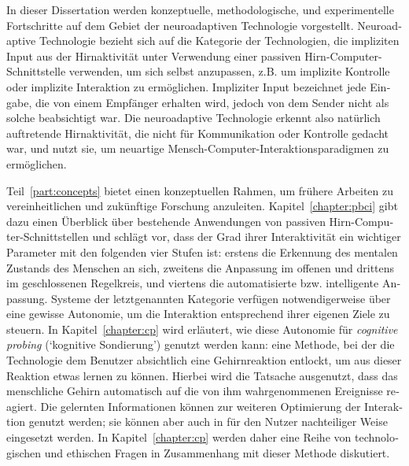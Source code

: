 \begin{otherlanguage}{ngerman}
In dieser Dissertation werden konzeptuelle, methodologische, und experimentelle Fortschritte auf dem Gebiet der neuroadaptiven Technologie vorgestellt. Neuroadaptive Technologie bezieht sich auf die Kategorie der Technologien, die impliziten Input aus der Hirnaktivität unter Verwendung einer passiven Hirn-Computer-Schnittstelle verwenden, um sich selbst anzupassen, z.B. um implizite Kontrolle oder implizite Interaktion zu ermöglichen. Impliziter Input bezeichnet jede Eingabe, die von einem Empfänger erhalten wird, jedoch von dem Sender nicht als solche beabsichtigt war. Die neuroadaptive Technologie erkennt also natürlich auftretende Hirnaktivität, die nicht für Kommunikation oder Kontrolle gedacht war, und nutzt sie, um neuartige Mensch-Computer-Interaktionsparadigmen zu ermöglichen. 

Teil~\ref{part:concepts} bietet einen konzeptuellen Rahmen, um frühere Arbeiten zu vereinheitlichen und zukünftige Forschung anzuleiten. Kapitel~\ref{chapter:pbci} gibt dazu einen Überblick über bestehende Anwendungen von passiven Hirn-Computer-Schnittstellen und schlägt vor, dass der Grad ihrer Interaktivität ein wichtiger Parameter mit den folgenden vier Stufen ist: erstens die Erkennung des mentalen Zustands des Menschen an sich, zweitens die Anpassung im offenen und drittens im geschlossenen Regelkreis, und viertens die automatisierte bzw. intelligente Anpassung. Systeme der letztgenannten Kategorie verfügen notwendigerweise über eine gewisse Autonomie, um die Interaktion entsprechend ihrer eigenen Ziele zu steuern. In Kapitel~\ref{chapter:cp} wird erläutert, wie diese Autonomie für \emph{cognitive probing} (`kognitive Sondierung') genutzt werden kann: eine Methode, bei der die Technologie dem Benutzer absichtlich eine Gehirnreaktion entlockt, um aus dieser Reaktion etwas lernen zu können. Hierbei wird die Tatsache ausgenutzt, dass das menschliche Gehirn automatisch auf die von ihm wahrgenommenen Ereignisse reagiert. Die gelernten Informationen können zur weiteren Optimierung der Interaktion genutzt werden; sie können aber auch in für den Nutzer nachteiliger Weise eingesetzt werden. In Kapitel~\ref{chapter:cp} werden daher eine Reihe von technologischen und ethischen Fragen in Zusammenhang mit dieser Methode diskutiert.


\end{otherlanguage}
